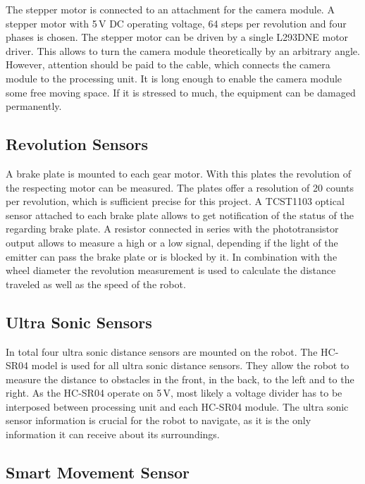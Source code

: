 The stepper motor is connected to an attachment for the camera module. A stepper motor with 5\,V DC operating voltage, 64 steps per revolution and four phases is chosen. The stepper motor can be driven by a single L293DNE motor driver. This allows to turn the camera module theoretically by an arbitrary angle. However, attention should be paid to the cable, which connects the camera module to the processing unit. It is long enough to enable the camera module some free moving space. If it is stressed to much, the equipment can be damaged permanently. 

\subsection{Revolution Sensors}\label{subsec:revolution_sensor}

A brake plate is mounted to each gear motor. With this plates the revolution of the respecting motor can be measured. The plates offer a resolution of 20 counts per revolution, which is sufficient precise for this project. A TCST1103 \cite{tcst1103} optical sensor attached to each brake plate allows to get notification of the status of the regarding brake plate. A resistor connected in series with the phototransistor output allows to measure a high or a low signal, depending if the light of the emitter can pass the brake plate or is blocked by it. In combination with the wheel diameter the revolution measurement is used to calculate the distance traveled as well as the speed of the robot.

\subsection{Ultra Sonic Sensors}\label{subsec:ultra_sonic_sensor}

In total four ultra sonic distance sensors are mounted on the robot. The HC-SR04 \cite{hc_sr04} model is used for all ultra sonic distance sensors. They allow the robot to measure the distance to obstacles in the front, in the back, to the left and to the right. As the HC-SR04 operate on 5\,V, most likely a voltage divider has to be interposed between processing unit and each HC-SR04 module. The ultra sonic sensor information is crucial for the robot to navigate, as it is the only information it can receive about its surroundings.

\subsection{Smart Movement Sensor}\label{subsec:smart_movement_sensor}

